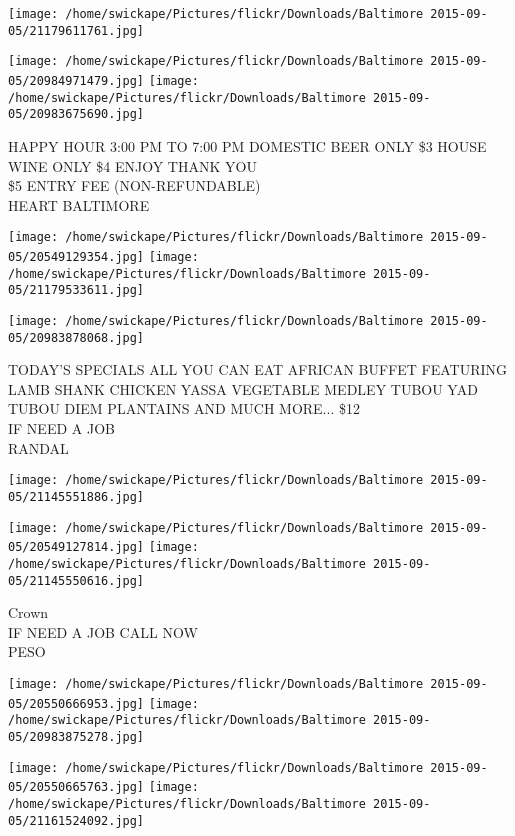 \documentclass[10pt,letterpaper]{article}
\begin{document}
\texttt{[image: /home/swickape/Pictures/flickr/Downloads/Baltimore 2015-09-05/21179611761.jpg]}

\vspace{0.25in}
\texttt{[image: /home/swickape/Pictures/flickr/Downloads/Baltimore 2015-09-05/20984971479.jpg]}
\texttt{[image: /home/swickape/Pictures/flickr/Downloads/Baltimore 2015-09-05/20983675690.jpg]}

HAPPY HOUR 3:00 PM TO 7:00 PM DOMESTIC BEER ONLY \$3 HOUSE WINE ONLY \$4 ENJOY THANK YOU\\
\$5 ENTRY FEE (NON{-}REFUNDABLE)\\
HEART BALTIMORE
\pagebreak

\texttt{[image: /home/swickape/Pictures/flickr/Downloads/Baltimore 2015-09-05/20549129354.jpg]}
\texttt{[image: /home/swickape/Pictures/flickr/Downloads/Baltimore 2015-09-05/21179533611.jpg]}

\vspace{0.25in}
\texttt{[image: /home/swickape/Pictures/flickr/Downloads/Baltimore 2015-09-05/20983878068.jpg]}

TODAY'S SPECIALS ALL YOU CAN EAT AFRICAN BUFFET FEATURING LAMB SHANK CHICKEN YASSA VEGETABLE MEDLEY TUBOU YAD TUBOU DIEM PLANTAINS AND MUCH MORE... \$12\\
IF NEED A JOB\\
RANDAL
\pagebreak

\texttt{[image: /home/swickape/Pictures/flickr/Downloads/Baltimore 2015-09-05/21145551886.jpg]}

\vspace{0.25in}
\texttt{[image: /home/swickape/Pictures/flickr/Downloads/Baltimore 2015-09-05/20549127814.jpg]}
\texttt{[image: /home/swickape/Pictures/flickr/Downloads/Baltimore 2015-09-05/21145550616.jpg]}

Crown\\
IF NEED A JOB CALL NOW\\
PESO
\pagebreak

\texttt{[image: /home/swickape/Pictures/flickr/Downloads/Baltimore 2015-09-05/20550666953.jpg]}
\texttt{[image: /home/swickape/Pictures/flickr/Downloads/Baltimore 2015-09-05/20983875278.jpg]}

\texttt{[image: /home/swickape/Pictures/flickr/Downloads/Baltimore 2015-09-05/20550665763.jpg]}
\texttt{[image: /home/swickape/Pictures/flickr/Downloads/Baltimore 2015-09-05/21161524092.jpg]}
\end{document}
